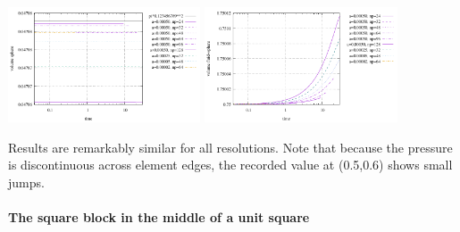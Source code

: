 \begin{center}
\includegraphics[width=5.7cm]{python_codes/fieldstone_93/results_exp2/vol_sphere}
\includegraphics[width=5.7cm]{python_codes/fieldstone_93/results_exp2/vol_fluidsphere}
\end{center}

Results are remarkably similar for all resolutions. Note that because the pressure 
is discontinuous across element edges, the recorded value at (0.5,0.6) shows small
jumps.


\newpage
\paragraph{The square block in the middle of a unit square}

